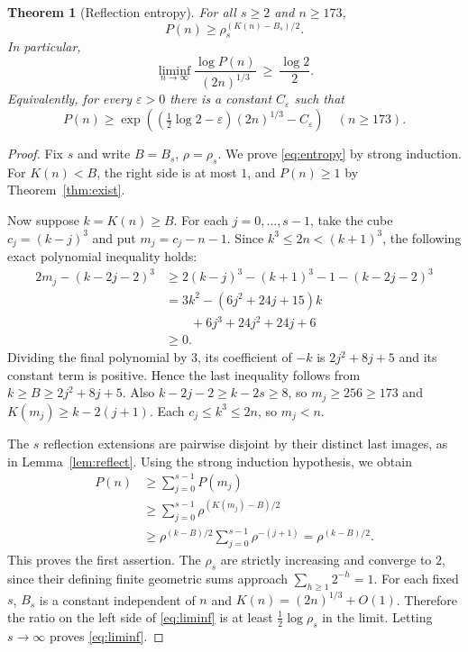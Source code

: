 \documentclass[10pt]{article}
\newtheorem{theorem}{Theorem}
\begin{document}
\begin{theorem}[Reflection entropy]\label{thm:entropy}
For all $s\ge2$ and $n\ge173$,
\begin{equation}\label{eq:entropy}
\boxed{\displaystyle P(n)\ge
\rho_s^{\left(K(n)-B_s\right)/2}.}
\end{equation}
In particular,
\begin{equation}\label{eq:liminf}
\boxed{\displaystyle
\liminf_{n\to\infty}
\frac{\log P(n)}{(2n)^{1/3}}
\ \ge\ \frac{\log 2}{2}.}
\end{equation}
Equivalently, for every $\varepsilon>0$ there is
a constant $C_\varepsilon$ such that
\[
P(n)\ge
\exp\left(\left(\tfrac12\log2-\varepsilon\right)
(2n)^{1/3}-C_\varepsilon\right)
\quad(n\ge173).
\]
\end{theorem}
\begin{proof}
Fix $s$ and write $B=B_s$, $\rho=\rho_s$.
We prove \eqref{eq:entropy} by strong induction.
For $K(n)<B$, the right side is at most $1$,
and $P(n)\ge1$ by Theorem~\ref{thm:exist}.

Now suppose $k=K(n)\ge B$. For each
$j=0,\dots,s-1$, take the cube
$c_j=(k-j)^3$ and put $m_j=c_j-n-1$.
Since $k^3\le2n<(k+1)^3$, the following
exact polynomial inequality holds:
\[
\begin{aligned}
2m_j-(k-2j-2)^3
&\ge 2(k-j)^3-(k+1)^3-1
 -(k-2j-2)^3\\
&=3k^2-(6j^2+24j+15)k\\
&\qquad+6j^3+24j^2+24j+6\\
&\ge0.
\end{aligned}
\]
Dividing the final polynomial by $3$, its
coefficient of $-k$ is $2j^2+8j+5$ and its
constant term is positive. Hence the last inequality
follows from $k\ge B\ge2j^2+8j+5$.
Also $k-2j-2\ge k-2s\ge8$, so
$m_j\ge256\ge173$ and
$K(m_j)\ge k-2(j+1)$.
Each $c_j\le k^3\le2n$, so $m_j<n$.

The $s$ reflection extensions are pairwise disjoint
by their distinct last images, as in
Lemma~\ref{lem:reflect}.
Using the strong induction hypothesis, we obtain
\[
\begin{aligned}
P(n)
&\ge\sum_{j=0}^{s-1}P(m_j)\\
&\ge\sum_{j=0}^{s-1}
\rho^{(K(m_j)-B)/2}\\
&\ge\rho^{(k-B)/2}
\sum_{j=0}^{s-1}\rho^{-(j+1)}
=\rho^{(k-B)/2}.
\end{aligned}
\]
This proves the first assertion. The $\rho_s$ are
strictly increasing and converge to $2$, since
their defining finite geometric sums approach
$\sum_{h\ge1}2^{-h}=1$. For each fixed $s$,
$B_s$ is a constant independent of $n$ and
$K(n)=(2n)^{1/3}+O(1)$.
Therefore the ratio on the left side of
\eqref{eq:liminf} is at least
$\tfrac12\log\rho_s$ in the limit.
Letting $s\to\infty$ proves \eqref{eq:liminf}.
\end{proof}
\end{document}
